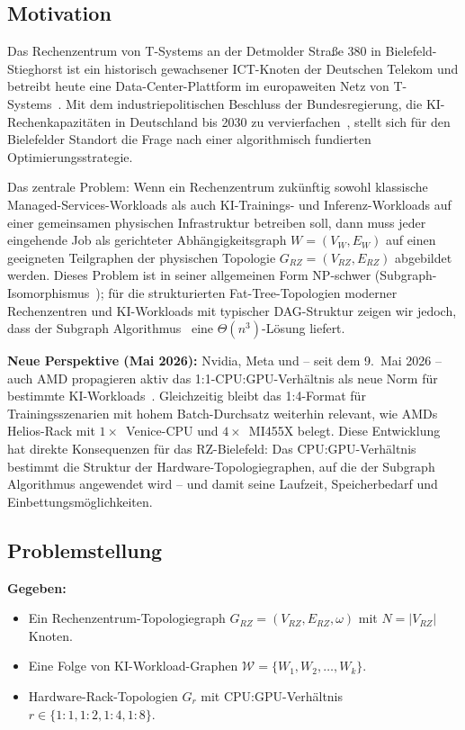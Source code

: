 ﻿\documentclass[a4paper,12pt]{article}
\theoremstyle{definition}
\begin{document}
\subsection{Motivation}

Das Rechenzentrum von T-Systems an der Detmolder Stra{\ss}e 380 in Bielefeld-Stieghorst ist ein historisch gewachsener ICT-Knoten der Deutschen Telekom und betreibt heute eine Data-Center-Plattform im europaweiten Netz von T-Systems~\cite{tsystems2025bielefeld}.
Mit dem industriepolitischen Beschluss der Bundesregierung, die KI-Rechenkapazit\"{a}ten in Deutschland bis 2030 zu vervierfachen~\cite{bundesregierung2026rechenzentrumsstrategie}, stellt sich f\"{u}r den Bielefelder Standort die Frage nach einer algorithmisch fundierten Optimierungsstrategie.

Das zentrale Problem: Wenn ein Rechenzentrum zuk\"{u}nftig sowohl klassische Managed-Services-Workloads als auch KI-Trainings- und Inferenz-Workloads auf einer gemeinsamen physischen Infrastruktur betreiben soll, dann muss jeder eingehende Job als gerichteter Abh\"{a}ngigkeitsgraph $W = (V_W, E_W)$ auf einen geeigneten Teilgraphen der physischen Topologie $G_{RZ} = (V_{RZ}, E_{RZ})$ abgebildet werden.
Dieses Problem ist in seiner allgemeinen Form NP-schwer (Subgraph-Isomorphismus~\cite{cook1971complexity}); f\"{u}r die strukturierten Fat-Tree-Topologien moderner Rechenzentren und KI-Workloads mit typischer DAG-Struktur zeigen wir jedoch, dass der Subgraph Algorithmus~\cite{epp2026subgraph} eine $\Theta(n^3)$-L\"{o}sung liefert.

\textbf{Neue Perspektive (Mai 2026):}
Nvidia, Meta und -- seit dem 9.~Mai 2026 -- auch AMD propagieren aktiv das 1:1-CPU:GPU-Verh\"{a}ltnis als neue Norm f\"{u}r bestimmte KI-Workloads~\cite{computerbase2026}. Gleichzeitig bleibt das 1:4-Format f\"{u}r Trainingsszenarien mit hohem Batch-Durchsatz weiterhin relevant, wie AMDs Helios-Rack mit $1\times$~Venice-CPU und $4\times$~MI455X belegt.
Diese Entwicklung hat direkte Konsequenzen f\"{u}r das RZ-Bielefeld: Das CPU:GPU-Verh\"{a}ltnis bestimmt die Struktur der Hardware-Topologiegraphen, auf die der Subgraph Algorithmus angewendet wird -- und damit seine Laufzeit, Speicherbedarf und Einbettungsm\"{o}glichkeiten.

\subsection{Problemstellung}

\textbf{Gegeben:}
\begin{itemize}
  \item Ein Rechenzentrum-Topologiegraph $G_{RZ} = (V_{RZ}, E_{RZ}, \omega)$ mit $N = |V_{RZ}|$ Knoten.
  \item Eine Folge von KI-Workload-Graphen $\mathcal{W} = \{W_1, W_2, \ldots, W_k\}$.
  \item Hardware-Rack-Topologien $G_r$ mit CPU:GPU-Verh\"{a}ltnis $r \in \{1:1, 1:2, 1:4, 1:8\}$.
\end{itemize}
\end{document}
